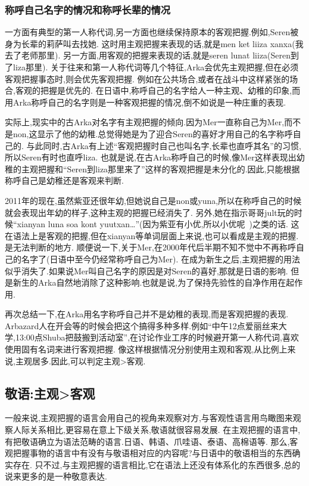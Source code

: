 \subsubsection{称呼自己名字的情况和称呼长辈的情况}

一方面有典型的第一人称代词,另一方面也继续保持原本的客观把握.例如,Seren被身为长辈的莉萨叫去找她.
这时用主观把握来表现的话,就是men ket liiza xanxa(我去了老师那里).
另一方面,用客观的把握来表现的话,就是seren lunat liiza(Seren到了liza那里).
关于往来和第一人称代词等几个特征,Arka会优先主观把握,但在必须客观把握事态时,则会优先客观把握.
例如在公共场合,或者在战斗中这样紧张的场合,客观的把握是优先的.
在日语中,称呼自己的名字给人一种主观、幼稚的印象,而用Arka称呼自己的名字则是一种客观把握的情况,倒不如说是一种庄重的表现.

实际上,现实中的古Arka对名字有主观把握的倾向.因为Mer一直称自己为Mer,而不是non,这显示了他的幼稚.总觉得她是为了迎合Seren的喜好才用自己的名字称呼自己的.
与此同时,古Arka有上述“客观把握时自己也叫名字,长辈也直呼其名”的习惯,所以Seren有时也直呼liza.
也就是说,在古Arka称呼自己的时候,像Mer这样表现出幼稚的主观把握和“Seren到liza那里来了”这样的客观把握是未分化的.因此,只能根据称呼自己是幼稚还是客观来判断.

2011年的现在,虽然紫亚还很年幼,但她说自己是non或yuna,所以在称呼自己的时候就会表现出年幼的样子,这种主观的把握已经消失了.
另外,她在指示哥哥jult玩的时候``xianyan luna soa kont yuutxan…''(因为紫亚有小优,所以小优呢~)之类的话.
这在语法上是客观的把握,但在xianyan等单词层面上来说,也可以看成是主观的把握.是无法判断的地方.
顺便说一下,关于Mer,在2000年代后半期不知不觉中不再称呼自己的名字了(日语中至今仍经常称呼自己为Mer).
在成为新生之后,主观把握的用法似乎消失了.如果说Mer叫自己名字的原因是对Seren的喜好,那就是日语的影响.
但是新生的Arka自然地消除了这种影响.也就是说,为了保持先验性的自净作用在起作用.

再次总结一下,在Arka用名字称呼自己并不是幼稚的表现,而是客观把握的表现.
Arbazard人在开会等的时候会把这个搞得多种多样.例如“中午12点爱丽丝来大学,13:00点Shuba把鼓搬到活动室”,在讨论作业工序的时候避开第一人称代词,喜欢使用固有名词来进行客观把握.
像这样根据情况分别使用主观和客观,从比例上来说,主观居多.因此,可以判定主观>客观.

\subsection{敬语:主观>客观}

一般来说,主观把握的语言会用自己的视角来观察对方,与客观性语言用鸟瞰图来观察人际关系相比,更容易在意上下级关系,敬语就很容易发展.
在主观把握的语言中,有把敬语确立为语法范畴的语言.日语、韩语、爪哇语、泰语、高棉语等.
那么,客观把握事物的语言中有没有与敬语相对应的内容呢?与日语中的敬语相当的东西确实存在.
只不过,与主观把握的语言相比,它在语法上还没有体系化的东西很多,总的说来更多的是一种敬意表达.


